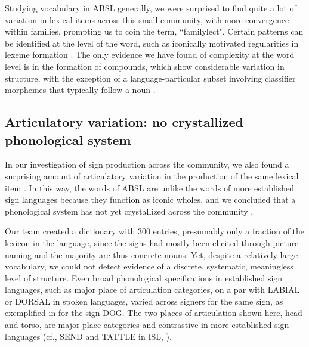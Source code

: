 \documentclass[output=paper]{langsci/langscibook}
\begin{document}
   Studying vocabulary in ABSL generally, we were surprised to find quite a lot of variation in lexical items across this small community, with more convergence within families, prompting us to coin the term, ``familylect".  Certain patterns can be identified at the level of the word, such as iconically motivated regularities in lexeme formation \citep{Padden2013,Lepic2016}.  The only evidence we have found of complexity at the word level is in the formation of compounds, which show considerable variation in structure, with the exception of a language-particular subset involving classifier morphemes that typically follow a noun \citep{Meir2010,Sandler2011a}. 


\subsection{Articulatory variation: no crystallized phonological system}

In our investigation of sign production across the community, we also found a surprising amount of articulatory variation in the production of the same lexical item %
\citep{IsraelSandler2011}.   In this way, the words of ABSL are unlike the words of more established sign languages because they function as iconic wholes, and we concluded that a phonological system has not yet crystallized across the community \citep{Sandler2011a}.

Our team created a dictionary with 300 entries, presumably only a fraction of the lexicon in the language, since the signs had mostly been elicited through picture naming and the majority are thus concrete nouns.  Yet, despite a relatively large vocabulary, we could not detect evidence of a discrete, systematic, meaningless level of structure. Even broad phonological specifications in established sign languages, such as major place of articulation categories, on a par with LABIAL or DORSAL in spoken languages, varied across signers for the same sign, as exemplified in  for the sign DOG.  The two places of articulation shown here, head and torso, are major place categories and contrastive in more established sign languages (cf., SEND and TATTLE in ISL, ).   
\end{document}
